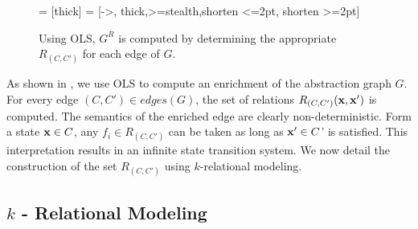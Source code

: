 \begin{figure}[!htbp]
\begin{center}
 = [thick]
 = [->, thick,>=stealth,shorten <=2pt, shorten >=2pt]
\end{center}
\vspace*{-.3cm}
\caption{Using OLS, $G^R$ is computed by determining the appropriate
$R_{(C,C')}$ for each edge of $G$.}
\label{fig:enrichment}
\vspace*{-.3cm}
\end{figure}

As shown in , we use OLS to compute an enrichment
of the abstraction graph $G$. For every edge $(C,C') \in edges(G)$,
the set of relations $R_{(C,C')}(\mathbf{x},\mathbf{x}')$ is computed. The semantics
of the enriched edge are clearly non-deterministic. Form a state $\mathbf{x}
\in C$, any $f_i\in R_{(C,C')}$ can be taken as long as $\mathbf{x}' \in C$'
is satisfied. This interpretation results in an infinite state
transition system. We now detail the construction of the set
$R_{(C,C')}$ using $k$-relational modeling.



\subsection{$k$ - Relational Modeling}

